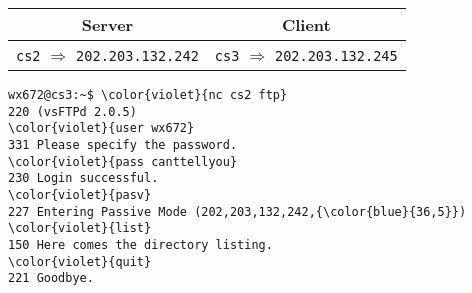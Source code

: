 \documentclass[varwidth=29em,crop]{standalone}
\begin{document}
\begin{tabular}{cc}
  \toprule
  \textbf{Server}&\textbf{Client}\\\midrule
  \texttt{cs2} $\Rightarrow$ \texttt{202.203.132.242}& \texttt{cs3} $\Rightarrow$ \texttt{202.203.132.245}\\\bottomrule
\end{tabular}

\begin{Verbatim}[commandchars=\\\{\}]
wx672@cs3:~$ \color{violet}{nc cs2 ftp}
220 (vsFTPd 2.0.5)
\color{violet}{user wx672}
331 Please specify the password.
\color{violet}{pass canttellyou}
230 Login successful.
\color{violet}{pasv}
227 Entering Passive Mode (202,203,132,242,{\color{blue}{36,5}})
\color{violet}{list}
150 Here comes the directory listing.
\color{violet}{quit}
221 Goodbye.
\end{Verbatim}
\end{document}
